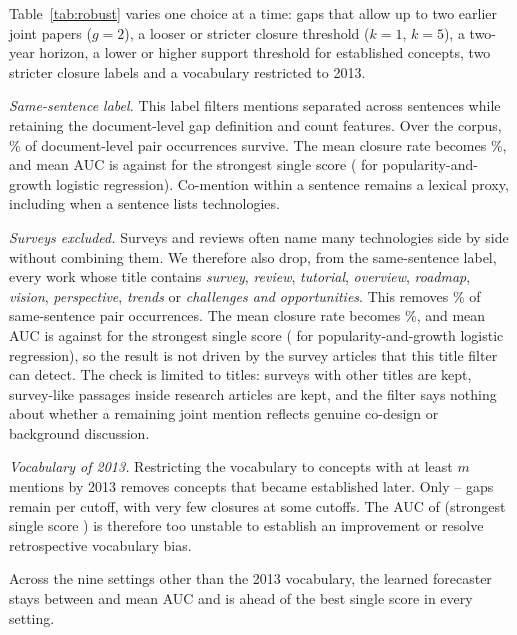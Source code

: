 \documentclass[runningheads]{llncs}
\begin{document}
Table~\ref{tab:robust} varies one choice at a time: gaps that allow up to two earlier joint papers ($g{=}2$), a looser or stricter closure threshold ($k{=}1$, $k{=}5$), a two-year horizon, a lower or higher support threshold for established concepts, two stricter closure labels and a vocabulary restricted to 2013.

\emph{Same-sentence label.} This label filters mentions separated across sentences while retaining the document-level gap definition and count features. Over the corpus, \pairsSentShare{}\% of document-level pair occurrences survive. The mean closure rate becomes \sentFill{}\%, and mean AUC is \sentLearned{} against \sentBest{} for the strongest single score (\sentLrpg{} for popularity-and-growth logistic regression). Co-mention within a sentence remains a lexical proxy, including when a sentence lists technologies.

\emph{Surveys excluded.} Surveys and reviews often name many technologies side by side without combining them. We therefore also drop, from the same-sentence label, every work whose title contains \emph{survey}, \emph{review}, \emph{tutorial}, \emph{overview}, \emph{roadmap}, \emph{vision}, \emph{perspective}, \emph{trends} or \emph{challenges and opportunities}. This removes \pairsSurveyShare{}\% of same-sentence pair occurrences. The mean closure rate becomes \sentnsFill{}\%, and mean AUC is \sentnsLearned{} against \sentnsBest{} for the strongest single score (\sentnsLrpg{} for popularity-and-growth logistic regression), so the result is not driven by the survey articles that this title filter can detect. The check is limited to titles: surveys with other titles are kept, survey-like passages inside research articles are kept, and the filter says nothing about whether a remaining joint mention reflects genuine co-design or background discussion.

\emph{Vocabulary of 2013.} Restricting the vocabulary to concepts with at least $m$ mentions by 2013 removes concepts that became established later. Only \vocabGapsLo{}--\vocabGapsHi{} gaps remain per cutoff, with very few closures at some cutoffs. The AUC of \vocabLearned{} (strongest single score \vocabBest{}) is therefore too unstable to establish an improvement or resolve retrospective vocabulary bias.

Across the nine settings other than the 2013 vocabulary, the learned forecaster stays between \robLo{} and \robHi{} mean AUC and is ahead of the best single score in every setting.

\begin{table}[t]
\centering
\caption{Vocabulary sensitivity over \subN{} fixed-seed subsets of \subK{}/\nConcepts{} concepts. Each run first averages AUC over the four cutoffs; entries summarise those run means. The single-score comparator is chosen retrospectively within each subset. Ranges are descriptive, not confidence intervals.}
\label{tab:subsets}
\small

\end{table}
\end{document}
